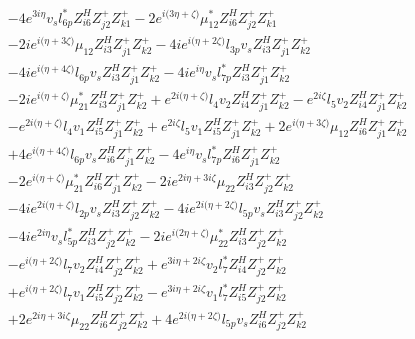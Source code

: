 \begin{align}
 &-4 e^{3 i \eta } v_s l_{6p}^* Z_{{i 6}}^{H} Z_{{j 2}}^{+} Z_{{k 1}}^{+} -2 e^{i \Big(3 \eta +\zeta \Big)} \mu_{12}^* Z_{{i 6}}^{H} Z_{{j 2}}^{+} Z_{{k 1}}^{+} \nonumber \\ 
 &-2 i e^{i \Big(\eta +3 \zeta \Big)} \mu_{12} Z_{{i 3}}^{H} Z_{{j 1}}^{+} Z_{{k 2}}^{+} -4 i e^{i \Big(\eta +2 \zeta \Big)} l_{3p} v_s Z_{{i 3}}^{H} Z_{{j 1}}^{+} Z_{{k 2}}^{+} \nonumber \\ 
 &-4 i e^{i \Big(\eta +4 \zeta \Big)} l_{6p} v_s Z_{{i 3}}^{H} Z_{{j 1}}^{+} Z_{{k 2}}^{+} -4 i e^{i \eta } v_s l_{7p}^* Z_{{i 3}}^{H} Z_{{j 1}}^{+} Z_{{k 2}}^{+} \nonumber \\ 
 &-2 i e^{i \Big(\eta +\zeta \Big)} \mu_{21}^* Z_{{i 3}}^{H} Z_{{j 1}}^{+} Z_{{k 2}}^{+} +e^{2 i \Big(\eta +\zeta \Big)} l_4 v_2 Z_{{i 4}}^{H} Z_{{j 1}}^{+} Z_{{k 2}}^{+} - e^{2 i \zeta } l_5 v_2 Z_{{i 4}}^{H} Z_{{j 1}}^{+} Z_{{k 2}}^{+} \nonumber \\ 
 &- e^{2 i \Big(\eta +\zeta \Big)} l_4 v_1 Z_{{i 5}}^{H} Z_{{j 1}}^{+} Z_{{k 2}}^{+} +e^{2 i \zeta } l_5 v_1 Z_{{i 5}}^{H} Z_{{j 1}}^{+} Z_{{k 2}}^{+} +2 e^{i \Big(\eta +3 \zeta \Big)} \mu_{12} Z_{{i 6}}^{H} Z_{{j 1}}^{+} Z_{{k 2}}^{+} \nonumber \\ 
 &+4 e^{i \Big(\eta +4 \zeta \Big)} l_{6p} v_s Z_{{i 6}}^{H} Z_{{j 1}}^{+} Z_{{k 2}}^{+} -4 e^{i \eta } v_s l_{7p}^* Z_{{i 6}}^{H} Z_{{j 1}}^{+} Z_{{k 2}}^{+} \nonumber \\ 
 &-2 e^{i \Big(\eta +\zeta \Big)} \mu_{21}^* Z_{{i 6}}^{H} Z_{{j 1}}^{+} Z_{{k 2}}^{+} -2 i e^{2 i \eta +3 i \zeta } \mu_{22} Z_{{i 3}}^{H} Z_{{j 2}}^{+} Z_{{k 2}}^{+} \nonumber \\ 
 &-4 i e^{2 i \Big(\eta +\zeta \Big)} l_{2p} v_s Z_{{i 3}}^{H} Z_{{j 2}}^{+} Z_{{k 2}}^{+} -4 i e^{2 i \Big(\eta +2 \zeta \Big)} l_{5p} v_s Z_{{i 3}}^{H} Z_{{j 2}}^{+} Z_{{k 2}}^{+} \nonumber \\ 
 &-4 i e^{2 i \eta } v_s l_{5p}^* Z_{{i 3}}^{H} Z_{{j 2}}^{+} Z_{{k 2}}^{+} -2 i e^{i \Big(2 \eta +\zeta \Big)} \mu_{22}^* Z_{{i 3}}^{H} Z_{{j 2}}^{+} Z_{{k 2}}^{+} \nonumber \\ 
 &- e^{i \Big(\eta +2 \zeta \Big)} l_7 v_2 Z_{{i 4}}^{H} Z_{{j 2}}^{+} Z_{{k 2}}^{+} +e^{3 i \eta +2 i \zeta } v_2 l_7^* Z_{{i 4}}^{H} Z_{{j 2}}^{+} Z_{{k 2}}^{+} \nonumber \\ 
 &+e^{i \Big(\eta +2 \zeta \Big)} l_7 v_1 Z_{{i 5}}^{H} Z_{{j 2}}^{+} Z_{{k 2}}^{+} - e^{3 i \eta +2 i \zeta } v_1 l_7^* Z_{{i 5}}^{H} Z_{{j 2}}^{+} Z_{{k 2}}^{+} \nonumber \\ 
 &+2 e^{2 i \eta +3 i \zeta } \mu_{22} Z_{{i 6}}^{H} Z_{{j 2}}^{+} Z_{{k 2}}^{+} +4 e^{2 i \Big(\eta +2 \zeta \Big)} l_{5p} v_s Z_{{i 6}}^{H} Z_{{j 2}}^{+} Z_{{k 2}}^{+} \nonumber \\ 

\end{align}
